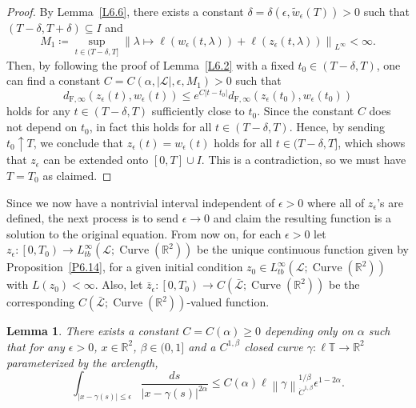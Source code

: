 \documentclass[reqno,centertags,12pt]{amsart}
\newtheorem{lemma}[theorem]{Lemma}
\theoremstyle{definition}
\numberwithin{equation}{section}
\newcommand{\abs}[1]{\left\lvert#1\right\rvert}
\newcommand{\norm}[1]{\left\|#1\right\|}
\newcommand{\bbR}{{\mathbb{R}}}
\newcommand{\bbT}{{\mathbb{T}}}
\begin{document}
\begin{proof}
    By Lemma~\ref{L6.6},
    there exists a constant $\delta=\delta(\epsilon,\tilde{w}_{\epsilon}(T))>0$ such that
    $(T-\delta,T+\delta)\subseteq I$ and
    \[
        M_{1}\coloneqq \sup_{t\in(T-\delta,T]}
        \norm{\lambda\mapsto
        \ell(w_{\epsilon}(t,\lambda)) + \ell(z_{\epsilon}(t,\lambda))}_{L^{\infty}}
        <\infty.
    \]
    Then, by following the proof of
    Lemma~\ref{L6.2}
    with a fixed $t_{0}\in (T-\delta,T)$, one can find a constant
    $C=C(\alpha,\abs{\mathcal{L}},\epsilon,M_{1})>0$ such that
    \[
        d_{\mathrm{F},\infty}(z_{\epsilon}(t),w_{\epsilon}(t))
        \leq e^{C\abs{t-t_{0}}}d_{\mathrm{F},\infty}
        (z_{\epsilon}(t_{0}),w_{\epsilon}(t_{0}))
    \]
    holds for any $t\in(T-\delta,T)$ sufficiently close to $t_{0}$.
    Since the constant $C$ does not depend on $t_{0}$, in fact this holds for
    all $t\in (T-\delta,T)$. Hence, by sending $t_{0}\uparrow T$, we conclude that
    $z_{\epsilon}(t) = w_{\epsilon}(t)$ holds for all $t\in(T-\delta,T]$,
    which shows that $z_{\epsilon}$ can be extended onto $[0,T]\cup I$.
    This is a contradiction, so we must have
    $T = T_{0}$ as claimed.
\end{proof}

Since we now have a nontrivial interval independent of $\epsilon>0$ where all of
$z_{\epsilon}$'s are defined, the next process is to send $\epsilon\to 0$ and claim
the resulting function is a solution to the original equation. From now on,
for each $\epsilon>0$ let $z_{\epsilon}\colon \left[0,T_{0}\right) \to
L_{tb}^{\infty}(\mathcal{L};\operatorname{Curve}(\bbR^{2}))$ be the unique continuous function
given by Proposition~\ref{P6.14}, for a given
initial condition $z_{0}\in L_{tb}^{\infty}(\mathcal{L};\operatorname{Curve}(\bbR^{2}))$
with $L(z_{0}) < \infty$. Also, let $\bar{z}_{\epsilon}\colon \left[0,T_{0}\right) \to
C(\bar{\mathcal{L}};\operatorname{Curve}(\bbR^{2}))$ be the corresponding
$C(\bar{\mathcal{L}};\operatorname{Curve}(\bbR^{2}))$-valued function.

\begin{lemma}\label{L6.15}
    There exists a constant $C=C(\alpha)\geq 0$ depending only on $\alpha$ such that
    for any $\epsilon>0$, $x\in\bbR^{2}$, $\beta\in(0,1]$ and a $C^{1,\beta}$ closed curve
    $\gamma\colon\ell\bbT\to\bbR^{2}$ parameterized by the arclength,
    \[
        \int_{\abs{x - \gamma(s)}\leq\epsilon}
        \frac{ds}{\abs{x - \gamma(s)}^{2\alpha}}
        \leq C(\alpha)\ell\norm{\gamma}_{\dot{C}^{1,\beta}}^{1/\beta}
        \epsilon^{1-2\alpha}.
    \]
\end{lemma}
\end{document}
